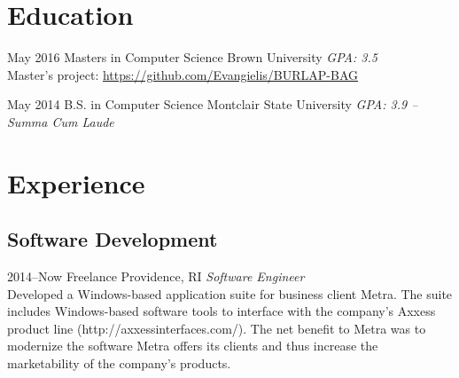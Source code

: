 \documentclass[]{friggeri-cv} %
\begin{document}
\section{Education}

\begin{entrylist}


\entry
{May 2016}
{Masters {\normalfont in Computer Science}}
{Brown University}
{\emph{GPA: 3.5} \\ Master's project: \href{https://github.com/Evangielis/BURLAP-BAG}{https://github.com/Evangielis/BURLAP-BAG}}


\entry
{May 2014}
{B.S. {\normalfont in Computer Science}}
{Montclair State University}
{\emph{GPA: 3.9 -- Summa Cum Laude}}


\end{entrylist}


\section{Experience}

\subsection{Software Development}

\begin{entrylist}


\entry
{2014--Now}
{Freelance}
{Providence, RI}
{\emph{Software Engineer} \\
Developed a Windows-based application suite for business client Metra.  The suite includes Windows-based software tools to interface with the company's Axxess product line (http://axxessinterfaces.com/).  The net benefit to Metra was to modernize the software Metra offers its clients and thus increase the marketability of the company's products. }


\end{entrylist}
\end{document}
